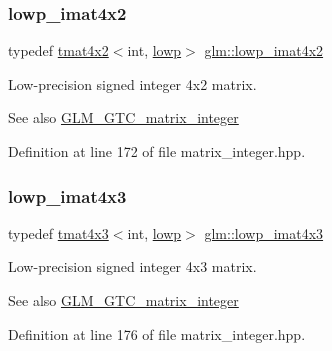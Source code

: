 \subsubsection{\texorpdfstring{lowp\_imat4x2}{lowp\_imat4x2}}
{\footnotesize\ttfamily typedef \mbox{\hyperlink{structglm_1_1tmat4x2}{tmat4x2}}$<$int, \mbox{\hyperlink{namespaceglm_a0f04f086094c747d227af4425893f545ae161af3fc695e696ce3bf69f7332bc2d}{lowp}}$>$ \mbox{\hyperlink{group__gtc__matrix__integer_ga87e2118b22cbc6916805aafcda52a943}{glm\+::lowp\+\_\+imat4x2}}}

Low-\/precision signed integer 4x2 matrix. \begin{DoxySeeAlso}{See also}
\mbox{\hyperlink{group__gtc__matrix__integer}{G\+L\+M\+\_\+\+G\+T\+C\+\_\+matrix\+\_\+integer}} 
\end{DoxySeeAlso}


Definition at line 172 of file matrix\+\_\+integer.\+hpp.

\mbox{\label{group__gtc__matrix__integer_ga76c201715b216ddd5d7de3c3759211f1}} 
\subsubsection{\texorpdfstring{lowp\_imat4x3}{lowp\_imat4x3}}
{\footnotesize\ttfamily typedef \mbox{\hyperlink{structglm_1_1tmat4x3}{tmat4x3}}$<$int, \mbox{\hyperlink{namespaceglm_a0f04f086094c747d227af4425893f545ae161af3fc695e696ce3bf69f7332bc2d}{lowp}}$>$ \mbox{\hyperlink{group__gtc__matrix__integer_ga76c201715b216ddd5d7de3c3759211f1}{glm\+::lowp\+\_\+imat4x3}}}

Low-\/precision signed integer 4x3 matrix. \begin{DoxySeeAlso}{See also}
\mbox{\hyperlink{group__gtc__matrix__integer}{G\+L\+M\+\_\+\+G\+T\+C\+\_\+matrix\+\_\+integer}} 
\end{DoxySeeAlso}


Definition at line 176 of file matrix\+\_\+integer.\+hpp.

\mbox{\label{group__gtc__matrix__integer_ga46f8dc46c3dcde8fa2e8b8f645c0d9ef}} 
